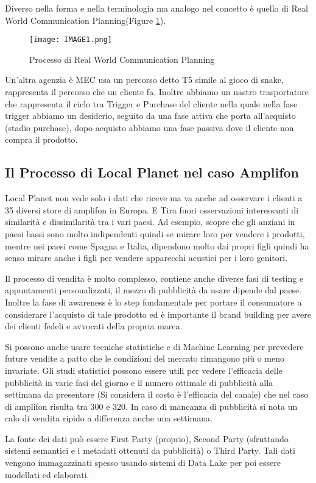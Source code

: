 \documentclass[11pt]{article}
\begin{document}
Diverso nella forma e nella terminologia ma analogo nel concetto è quello di Real World Communication Planning(Figure \ref{fig:RealWorld}).

\begin{figure}[h!]
	\centering
	\texttt{[image: IMAGE1.png]}
	\caption{Processo di Real World Communication Planning}
	\label{fig:RealWorld}
\end{figure}

Un'altra agenzia è MEC usa un percorso detto T5 simile al gioco di snake, rappresenta il percorso che un cliente fa. 
Inoltre abbiamo un nastro trasportatore che rappresenta il ciclo tra Trigger e Purchase del cliente nella quale nella fase trigger abbiamo un desiderio, seguito da una fase attiva che porta all'acquisto (stadio purchase), dopo acquisto abbiamo una fase passiva dove il cliente non compra il prodotto.

\subsection{Il Processo di Local Planet nel caso Amplifon}
Local Planet non vede solo i dati che riceve ma va anche ad osservare i clienti a 35 diversi store di amplifon in Europa.
E Tira fuori osservazioni interessanti di similarità e dissimilarità tra i vari paesi. 
Ad esempio, scopre che gli anziani in paesi bassi sono molto indipendenti quindi se mirare loro per vendere i prodotti, mentre nei paesi come Spagna e Italia, dipendono molto dai propri figli quindi ha senso mirare anche i figli per vendere apparecchi acustici per i loro genitori.

Il processo di vendita è molto complesso, contiene anche diverse fasi di testing e appuntamenti personalizzati, il mezzo di pubblicità da usare dipende dal paese. 
Inoltre la fase di awareness è lo step fondamentale per portare il consumatore a considerare l'acquisto di tale prodotto ed è importante il brand building per avere dei clienti fedeli e avvocati della propria marca.

Si possono anche usare tecniche statistiche e di Machine Learning per prevedere future vendite a patto che le condizioni del mercato rimangono più o meno invariate. 
Gli studi statistici possono essere utili per vedere l'efficacia delle pubblicità in varie fasi del giorno e il numero ottimale di pubblicità alla settimana da presentare (Si considera il costo è l'efficacia del canale) che nel caso di amplifon risulta tra 300 e 320.
In caso di mancanza di pubblicità si nota un calo di vendita ripido a differenza anche una settimana.

La fonte dei dati può essere First Party (proprio), Second Party (sfruttando sistemi semantici e i metadati ottenuti da pubblicità) o Third Party. 
Tali dati vengono immagazzinati spesso usando sistemi di Data Lake per poi essere modellati ed elaborati.
\end{document}
